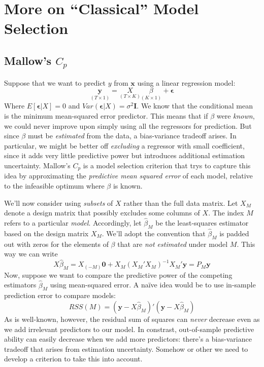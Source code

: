 \chapter{More on ``Classical'' Model Selection}


\section{Mallow's $C_p$}
Suppose that we want to predict $y$ from $\mathbf{x}$ using a linear regression model:
	$$\underset{(T\times1)}{\textbf{y}} = \underset{(T\times K)}{X} \underset{(K\times 1)}{\beta} + \boldsymbol{\epsilon}$$
Where $E[\boldsymbol{\epsilon}|X] = 0$ and $Var(\boldsymbol{\epsilon}|X) = \sigma^2 \mathbf{I}$. 
We know that the conditional mean is the minimum mean-squared error predictor.
This means that if $\beta$ were \emph{known}, we could never improve upon simply using all the regressors for prediction.
But since $\beta$ must be \emph{estimated} from the data, a bias-variance tradeoff arises.
In particular, we might be better off \emph{excluding} a regressor with small coefficient, since it adds very little predictive power but introduces additional estimation uncertainty.
Mallow's $C_p$ is a model selection criterion that trys to capture this idea by approximating the \emph{predictive mean squared error} of each model, relative to the infeasible optimum where $\beta$ is known.

We'll now consider using \emph{subsets} of $X$ rather than the full data matrix. 
Let $X_M$ denote a design matrix that possibly excludes some columns of $X$. 
The index $M$ refers to a particular \emph{model}. 
Accordingly, let $\widehat{\beta}_M$ be the least-squares estimator based on the design matrix $X_M$. 
We'll adopt the convention that $\widehat{\beta}_M$ is padded out with zeros for the elements of $\beta$ that are \emph{not estimated} under model $M$. 
This way we can write
	$$X\widehat{\beta}_M = X_{(-M)}\textbf{0} + X_M (X_M'X_M)^{-1} X_M'\textbf{y} = P_M \textbf{y}$$
Now, suppose we want to compare the predictive power of the competing estimators $\widehat{\beta}_M$ using mean-squared error. A na\"{i}ve idea would be to use in-sample prediction error to compare models:
	$$RSS(M) = (\textbf{y} - X\widehat{\beta}_M)'(\textbf{y} - X\widehat{\beta}_M)$$
As is well-known, however, the residual sum of squares can \emph{never} decrease even as we add irrelevant predictors to our model. In constrast, out-of-sample predictive ability can easily decrease when we add more predictors: there's a bias-variance tradeoff that arises from estimation uncertainty. Somehow or other we need to develop a criterion to take this into account.

